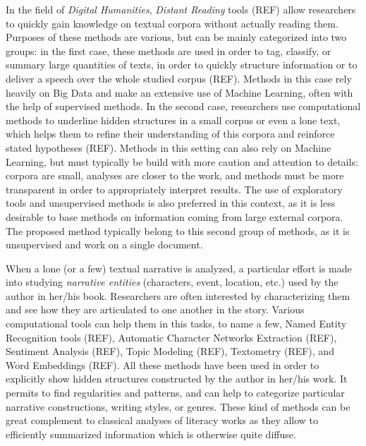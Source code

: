 \documentclass[
twocolumn,
]{ceurart}
\begin{document}
In the field of \emph{Digital Humanities}, \emph{Distant Reading} tools (REF) allow researchers to quickly gain knowledge on textual corpora without actually reading them. Purposes of these methods are various, but can be mainly categorized into two groups: in the first case, these methods are used in order to tag, classify, or summary large quantities of texts, in order to quickly structure information or to deliver a speech over the whole studied corpus (REF). Methods in this case rely heavily on Big Data and make an extensive use of Machine Learning, often with the help of supervised methods. In the second case, researchers use computational methods to underline hidden structures in a small corpus or even a lone text, which helps them to refine their understanding of this corpora and reinforce stated hypotheses (REF). Methods in this setting can also rely on Machine Learning, but must typically be build with more caution and attention to details: corpora are small, analyses are closer to the work, and methods must be more transparent in order to appropriately interpret results. The use of exploratory tools and unsupervised methods is also preferred in this context, as it is less desirable to base methods on information coming from large external corpora. The proposed method typically belong to this second group of methods, as it is unsupervised and work on a single document.

When a lone (or a few) textual narrative is analyzed, a particular effort is made into studying \emph{narrative entities} (characters, event, location, etc.) used by the author in her/his book. Researchers are often interested by characterizing them and see how they are articulated to one another in the story. Various computational tools can help them in this tasks, to name a few, Named Entity Recognition tools (REF), Automatic Character Networks Extraction (REF), Sentiment Analysis (REF), Topic Modeling (REF), Textometry (REF), and Word Embeddings (REF). All these methods have been used in order to explicitly show hidden structures constructed by the author in her/his work. It permits to find regularities and patterns, and can help to categorize particular narrative constructions, writing styles, or genres. These kind of methods can be great complement to classical analyses of literacy works as they allow to efficiently summarized information which is otherwise quite diffuse.
\end{document}
